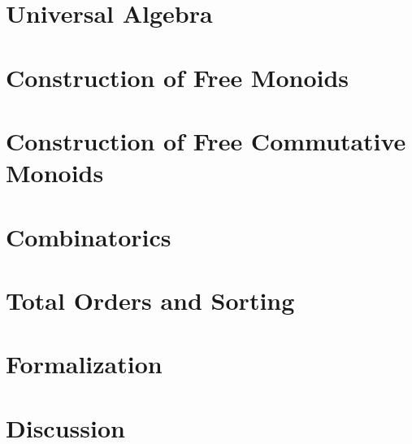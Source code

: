 \documentclass{l4proj}
\begin{document}
\chapter{Universal Algebra}


\chapter{Construction of Free Monoids}


\chapter{Construction of Free Commutative Monoids}


\chapter{Combinatorics}


\chapter{Total Orders and Sorting}


\chapter{Formalization}


\chapter{Discussion}

\end{document}
